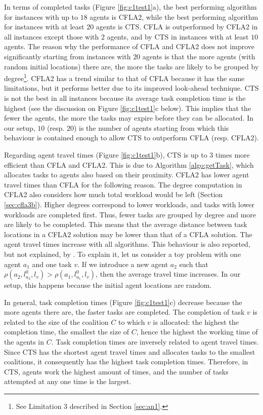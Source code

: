 In terms of completed tasks (Figure \ref{fig:c1test1}a), the best performing algorithm for
instances with up to $18$ agents is CFLA2, while the best performing algorithm for
instances with at least $20$ agents is CTS. CFLA is outperformed by CFLA2 in all instances
except those with $2$ agents, and by CTS in instances with at least $10$ agents. The
reason why the performance of CFLA and CFLA2 does not improve significantly starting from
instances with $20$ agents is that the more agents (with random initial locations) there
are, the more the tasks are likely to be grouped by degree\footnote{See Limitation $3$
described in Section \ref{sec:an1}.}. CFLA2 has a trend similar to that of CFLA because it
has the same limitations, but it performs better due to its improved look-ahead technique.
CTS is not the best in all instances because its average task completion time is the
highest (see the discussion on Figure \ref{fig:c1test1}c below). This implies that the
fewer the agents, the more the tasks may expire before they can be allocated. In our
setup, $10$ (resp. $20$) is the number of agents starting from which this behaviour is
contained enough to allow CTS to outperform CFLA (resp. CFLA2).

Regarding agent travel times (Figure \ref{fig:c1test1}b), CTS is up to $3$ times more
efficient than CFLA and CFLA2. This is due to Algorithm \ref{algo:getTask}, which
allocates tasks to agents also based on their proximity. CFLA2 has lower agent travel
times than CFLA for the following reason. The degree computation in CFLA2 also considers
how much total workload would be left (Section \ref{sec:cfla3b}). Higher degrees
correspond to lower workloads, and tasks with lower workloads are completed first. Thus,
fewer tasks are grouped by degree and more are likely to be completed. This means that the
average distance between task locations in a CFLA2 solution may be lower than that of a
CFLA solution. The agent travel times increase with all algorithms. This behaviour is also
reported, but not explained, by \cite{ramchurn2010cfstp}. To explain it, let us consider a
toy problem with one agent $a_1$ and one task $v$. If we introduce a new agent $a_2$ such
that $\rho(a_2, l_{a_2}^0, l_v) > \rho(a_1, l_{a_1}^0, l_v)$, then the average travel time
increases. In our setup, this happens because the initial agent locations are random.

In general, task completion times (Figure \ref{fig:c1test1}c) decrease because the more
agents there are, the faster tasks are completed. The completion of task $v$ is
related to the size of the coalition $C$ to which $v$ is allocated: the highest the
completion time, the smallest the size of $C$, hence the highest the working time of the
agents in $C$. Task completion times are inversely related to agent travel times. Since
CTS has the shortest agent travel times and allocates tasks to the smallest coalitions, it
consequently has the highest task completion times. Therefore, in CTS, agents work the
highest amount of times, and the number of tasks attempted at any one time is the largest.
\clearpage

